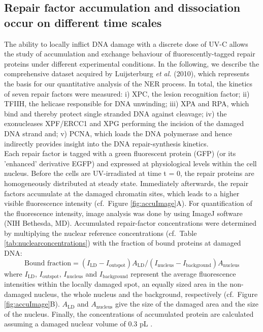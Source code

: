 \subsection{Repair factor accumulation and dissociation occur on different time scales}
\label{subsec:AccuFlipExp}
The ability to locally inflict DNA damage with a discrete dose of UV-C allows the study of accumulation and exchange behaviour of fluorescently-tagged repair proteins under different experimental conditions. In the following, we describe the comprehensive dataset acquired by Luijsterburg \textit{et al.} (2010)\cite{Luijsterburg2010}, which represents the basis for our quantitative analysis of the NER process. In total, the kinetics of seven repair factors were measured: i) XPC, the lesion recognition factor; ii) TFIIH, the helicase responsible for DNA unwinding; iii) XPA and RPA, which bind and thereby protect single stranded DNA against cleavage; iv) the exonucleases XPF/ERCC1 and XPG performing the incision of the damaged DNA strand and; v) PCNA, which loads the DNA polymerase and hence indirectly provides insight into the DNA repair-synthesis kinetics. \\
Each repair factor is tagged with a green fluorescent protein (GFP) (or its 'enhanced' derivative EGFP) and expressed at physiological levels within the cell nucleus. Before the cells are UV-irradiated at time t = 0, the repair proteins are homogeneously distributed at steady state. Immediately afterwards, the repair factors accumulate at the damaged chromatin sites, which leads to a higher visible fluorescence intensity (cf.\ Figure \ref{fig:accuImage}A). For quantification of the fluorescence intensity, image analysis was done by using ImageJ software (NIH Bethesda, MD). Accumulated repair-factor concentrations were determined by multiplying the nuclear reference concentrations (cf.\ Table \ref{tab:nuclearconcentrations}) with the fraction of bound proteins at damaged DNA:
%
%
\begin{equation}
\text{Bound fraction} = (I_\text{LD} - I_\text{outspot})A_\text{LD}/ (I_\text{nucleus} - I_\text{background})A_\text{nucleus}
\label{Eqn:BoundFraction}
\end{equation}     
where $I_\text{LD}$, $I_\text{outspot}$, $I_\text{nucleus}$ and $I_\text{background}$ represent the average fluorescence intensities within the locally damaged spot, an equally sized area in the non-damaged nucleus, the whole nucleus and the background, respectively (cf.\ Figure \ref{fig:accuImage}B). $A_\text{LD}$ and $A_\text{nucleus}$ give the size of the damaged area and the size of the nucleus. Finally, the concentrations of accumulated protein are calculated assuming a damaged nuclear volume of 0.3 pL \cite{Luijsterburg2010}.\\   

